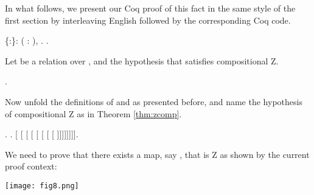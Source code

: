     In what follows, we present our Coq proof of this fact in the same
    style of the first section by interleaving English followed by the
    corresponding Coq code. \begin{coqdoccode}
\coqdocemptyline
\coqdocnoindent
{}  \{:\}: \coqdockw{\ensuremath{\forall}} ( : ),     . .\coqdoceol
\coqdocemptyline
\end{coqdoccode}
Let  be a relation over , and  the hypothesis that 
      satisfies compositional Z. \begin{coqdoccode}
\coqdocemptyline
\coqdocindent{1.00em}
  .\coqdoceol
\coqdocemptyline
\end{coqdoccode}
Now unfold the definitions of  and  as presented
      before, and name the hypothesis of compositional Z as in Theorem
      \ref{thm:zcomp}. \begin{coqdoccode}
\coqdocemptyline
\coqdocindent{1.00em}
 .    .    [  [  [ [ [ [ [ [ ]]]]]]]].\coqdoceol
\coqdocemptyline
\end{coqdoccode}
We need to prove that there exists a map, say , that is Z as shown by the current proof context:


      \texttt{[image: fig8.png]}


